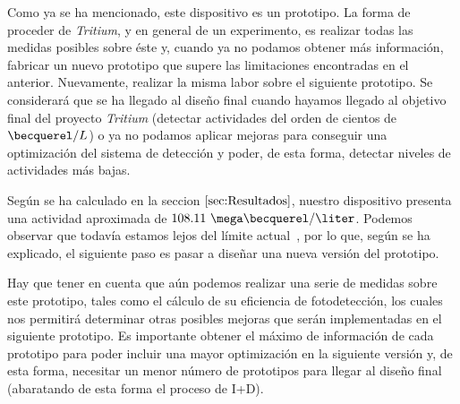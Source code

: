 Como ya se ha mencionado, este dispositivo es un prototipo. La forma de proceder de \textit{Tritium}, y en general de un experimento, es realizar todas las medidas posibles sobre éste y, cuando ya no podamos obtener más información, fabricar un nuevo prototipo que supere las limitaciones encontradas en el anterior. Nuevamente, realizar la misma labor sobre el siguiente prototipo. Se considerará que se ha llegado al diseño final cuando hayamos llegado al objetivo final del proyecto \textit{Tritium} (detectar actividades del orden de cientos de $\becquerel/L$) o ya no podamos aplicar mejoras para conseguir una optimización del sistema de detección y poder, de esta forma, detectar niveles de actividades más bajas.

Según se ha calculado  en la seccion $\ref{sec:Resultados}$, nuestro dispositivo presenta una actividad aproximada de $108.11~\mega\becquerel/\liter$. Podemos observar que todavía estamos lejos del límite actual~\cite{Rat}, por lo que, según se ha explicado, el siguiente paso es pasar a diseñar una nueva versión del prototipo. 

Hay que tener en cuenta que aún podemos realizar una serie de medidas sobre este prototipo, tales como el cálculo de su eficiencia de fotodetección, los cuales nos permitirá determinar otras posibles mejoras que serán implementadas en el siguiente prototipo. Es importante obtener el máximo de información de cada prototipo para poder incluir una mayor optimización en la siguiente versión y, de esta forma, necesitar un menor número de prototipos para llegar al diseño final (abaratando de esta forma el proceso de I+D). 

